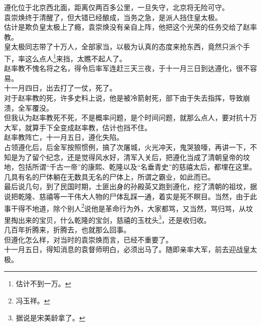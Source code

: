 \begin{multicols}{\theparacolNo}
遵化位于北京西北面，距离仅两百多公里，一旦失守，北京将无险可守。\\

袁崇焕终于清醒了，但大错已经酿成，当务之急，是派人挡住皇太极。\\

估计是欺负皇太极上了瘾，袁崇焕没有亲自上阵，他把这个光荣的任务交给了赵率教。\\

皇太极同志带了十万人，全部家当，以极为认真的态度来抢东西，竟然只派个手下，率这么点人\footnote{估计不到一万。}来挡，太瞧不起人了。\\

赵率教不愧名将之名，得令后率军连赶三天三夜，于十一月三日到达遵化，很不容易。\\

十一月四日，出去打了一仗，死了。\\

对于赵率教的死，许多史料上说，他是被冷箭射死，部下由于失去指挥，导致崩溃，全军覆没。\\

但我认为赵率教死不死，不是概率问题，是个时间问题，就那么点人，要对抗十万大军，就算手下全变成赵率教，估计也挡不住。\\

赵率教阵亡，十一月五日，遵化失陷。\\

占领遵化后，后金军按照惯例，搞了次屠城，火光冲天，鬼哭狼嚎，再讲一下，不知是为了留个纪念，还是觉得风水好，清军入关后，把遵化当成了清朝皇帝的坟地，包括所谓“千古一帝”的康熙、乾隆以及“名垂青史”的慈禧太后，都埋在这里。\\

几具有名的尸体躺在无数具无名的尸体上，所谓之霸业，如此而已。\\

最后说几句，到了民国时期，土匪出身的孙殿英又跑到遵化，挖了清朝的祖坟，据说把乾隆、慈禧等一干伟大人物的尸体乱踩一通，着实是死不瞑目。当然，由于此事干得不地道，除个别人\footnote{冯玉祥。}说他是革命行为外，大家都骂，又当然，骂归骂，从坟里掏出来的宝贝，什么乾隆的宝剑，慈禧的玉枕头\footnote{据说是宋美龄拿了。}，还是收归收。\\

几百年折腾来，折腾去，也就那么回事。\\

但遵化怎么样，对当时的袁崇焕而言，已经不重要了。\\

十一月五日，得知消息的袁督师明白，必须出马了。随即亲率大军，前去迎战皇太极。\\


\end{multicols}
